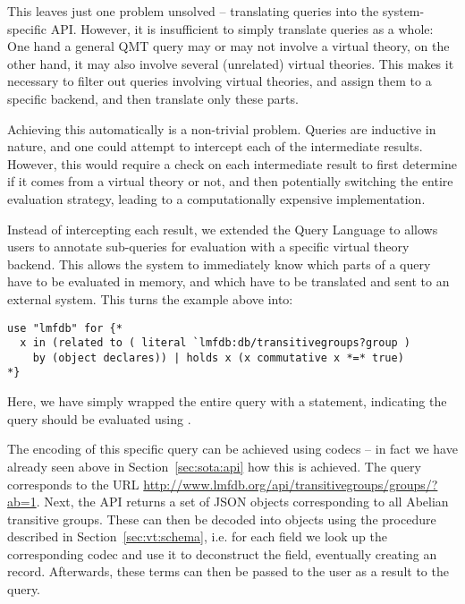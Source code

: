 This leaves just one problem unsolved -- translating queries into the system-specific API. 
However, it is insufficient to simply translate queries as a whole: 
One hand a general QMT query may or may not involve a virtual theory, on the other hand, it may also involve several (unrelated) virtual theories. 
This makes it necessary to filter out queries involving virtual theories, and assign them to a specific backend, and then translate only these parts. 

Achieving this automatically is a non-trivial problem. 
Queries are inductive in nature, and one could attempt to intercept each of the intermediate results. 
However, this would require a check on each intermediate result to first determine if it comes from a virtual theory or not, and then potentially switching the entire evaluation strategy, leading to a computationally expensive implementation. 

Instead of intercepting each result, we extended the Query Language to allows users to annotate sub-queries for evaluation with a specific virtual theory backend. 
This allows the system to immediately know which parts of a query have to be evaluated in \mmt memory, and which have to be translated and sent to an external system. 
This turns the example above into:
\begin{lstlisting}[language=qmt]
use "lmfdb" for {*
  x in (related to ( literal `lmfdb:db/transitivegroups?group ) 
    by (object declares)) | holds x (x commutative x *=* true)
*}
\end{lstlisting}
Here, we have simply wrapped the entire query with a  statement, indicating the query should be evaluated using \lmfdb. 

The encoding of this specific query can be achieved using codecs -- in fact we have already seen above in Section~\ref{sec:sota:api} how this is achieved. 
The query corresponds to the URL \url{http://www.lmfdb.org/api/transitivegroups/groups/?ab=1}. 
Next, the \lmfdb API returns a set of JSON objects corresponding to all Abelian transitive groups. 
These can then be decoded into \ommt objects using the procedure described in Section~\ref{sec:vt:schema}, i.e. for each field we look up the corresponding codec and use it to deconstruct the field, eventually creating an \mmt record. 
Afterwards, these \ommt terms can then be passed to the user as a result to the query. 

